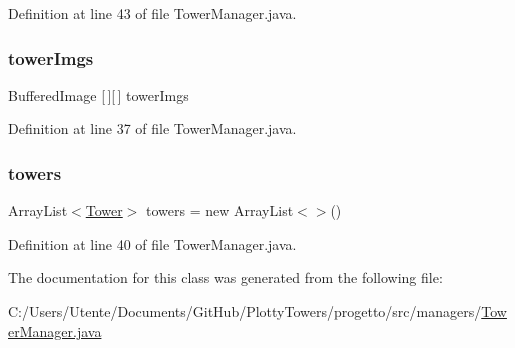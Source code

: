 Definition at line 43 of file Tower\+Manager.\+java.

\mbox{\label{classmanagers_1_1_tower_manager_a9e41697ad86c9524ce67f7e91358e17e}} 
\subsubsection{\texorpdfstring{tower\+Imgs}{towerImgs}}
{\footnotesize\ttfamily Buffered\+Image \mbox{[}$\,$\mbox{]}\mbox{[}$\,$\mbox{]} tower\+Imgs\hspace{0.3cm}{\ttfamily [private]}}



Definition at line 37 of file Tower\+Manager.\+java.

\mbox{\label{classmanagers_1_1_tower_manager_a8018061adcbaafb8625d999c4e53a3aa}} 
\subsubsection{\texorpdfstring{towers}{towers}}
{\footnotesize\ttfamily Array\+List$<$\hyperlink{classtowers_1_1_tower}{Tower}$>$ towers = new Array\+List$<$$>$()\hspace{0.3cm}{\ttfamily [private]}}



Definition at line 40 of file Tower\+Manager.\+java.



The documentation for this class was generated from the following file\+:\begin{DoxyCompactItemize}
\item 
C\+:/\+Users/\+Utente/\+Documents/\+Git\+Hub/\+Plotty\+Towers/progetto/src/managers/\hyperlink{_tower_manager_8java}{Tower\+Manager.\+java}\end{DoxyCompactItemize}
